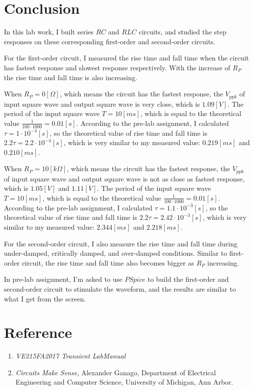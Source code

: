 \documentclass[12pt]{article}
\begin{document}
\section{Conclusion}
In this lab work, I built series $RC$ and $RLC$ circuits, and studied the step responses on these corresponding first-order and second-order circuits.
\par For the first-order circuit, I measured the rise time and fall time when the circuit has fastest response and slowest response respectively. With the increase of $R_P$ the rise time and fall time is also increasing.
\par When $R_P=0[\Omega]$, which means the circuit has the fastest response, the $V_{ppk}$ of input square wave and output square wave is very close, which is $1.09[V]$. The period of the input square wave $T=10[ms]$, which is equal to the theoretical value $\frac{1}{100\cdot 1000}=0.01[s]$. According to the pre-lab assignment, I calculated $\tau=1\cdot 10^{-4}[s]$, so the theoretical value of rise time and fall time is $2.2\tau=2.2\cdot10^{-4}[s]$, which is very similar to my measured value: $0.219[ms]$ and $0.210[ms]$.
\par When $R_P=10[k\Omega]$, which means the circuit has the fastest response, the $V_{ppk}$ of input square wave and output square wave is not as close as fastest response, which is $1.05[V]$ and $1.11[V]$. The period of the input square wave $T=10[ms]$, which is equal to the theoretical value $\frac{1}{100\cdot 1000}=0.01[s]$. According to the pre-lab assignment, I calculated $\tau=1.1\cdot 10^{-3}[s]$, so the theoretical value of rise time and fall time is $2.2\tau=2.42\cdot10^{-3}[s]$, which is very similar to my measured value: $2.344[ms]$ and $2.218[ms]$.
\par For the second-order circuit, I also measure the rise time and fall time during under-damped, critically damped, and over-damped conditions. Similar to first-order circuit, the rise time and  fall time also becomes bigger as $R_P$ increasing.
\par In pre-lab assignment, I'm asked to use $PSpice$ to build the first-order and second-order circuit to stimulate the waveform, and the results are similar to what I get from the screen. 
\section{Reference}
\begin{enumerate}[-]
\item \emph{VE215FA2017 Transient LabManual} 
\item \emph{Circuits Make Sense}, Alexander Ganago, Department of Electrical Engineering and Computer Science, University of Michigan, Ann Arbor.
\end{enumerate}
\end{document}
